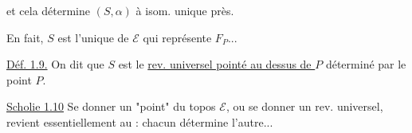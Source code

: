 et cela détermine \((S,\alpha)\) à isom. unique près.

En fait, \(S\) est l'unique 
de \(\mathcal E\) qui représente \(F_P\)...

\uline{Déf. 1.9.} On dit que \(S\)
 est le
\uline{rev. universel pointé au dessus de \(P\)} déterminé
par le point \(P\).

\uline{Scholie 1.10} Se donner un "point" du \unsure{:}
topos  \(\mathcal E\), ou se donner un
rev. universel, revient essentiellement au
\unsure{\(\stackrel{-}{\sim}\)} : chacun détermine l'autre...
